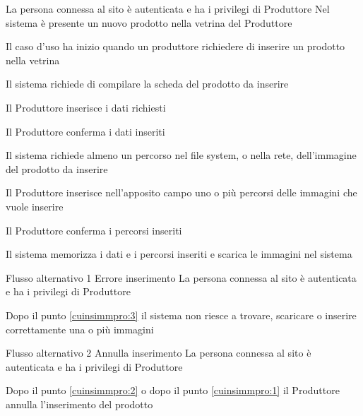 \tabcuvspace

{}
{La persona connessa al sito è autenticata e ha i privilegi di Produttore}
{Nel sistema è presente un nuovo prodotto nella vetrina del Produttore}
{\begin{enumCU}
		\item Il caso d'uso ha inizio quando un produttore richiedere di inserire un prodotto nella vetrina
		\item Il sistema richiede di compilare la scheda del prodotto da inserire
		\item Il Produttore inserisce i dati richiesti \label{cuinsimmpro:1}
		\item Il Produttore conferma i dati inseriti 
		\item Il sistema richiede almeno un percorso nel file system, o nella rete, dell'immagine del prodotto da inserire
		\item Il Produttore inserisce nell'apposito campo uno o più percorsi  delle immagini che vuole inserire \label{cuinsimmpro:2}
		\item Il Produttore conferma i percorsi inseriti \label{cuinsimmpro:3}
		\item Il sistema memorizza i dati e i percorsi inseriti e scarica le immagini nel sistema
	\end{enumCU}}
%
{Flusso alternativo 1}%
{Errore inserimento}%
{La persona connessa al sito è autenticata e ha i privilegi di Produttore}%
{\postNulle}%
{\begin{enumCU}
		\item Dopo il punto \ref{cuinsimmpro:3} il sistema non riesce a trovare, scaricare o inserire correttamente una o più immagini
	\end{enumCU}}%
%
{Flusso alternativo 2}%
{Annulla inserimento}%
{La persona connessa al sito è autenticata e ha i privilegi di Produttore}%
{\postNulle}%
{\begin{enumCU}
		\item Dopo il punto \ref{cuinsimmpro:2} o dopo il punto \ref{cuinsimmpro:1} il Produttore annulla l'inserimento del prodotto
	\end{enumCU}}%

\tabcuvspace

